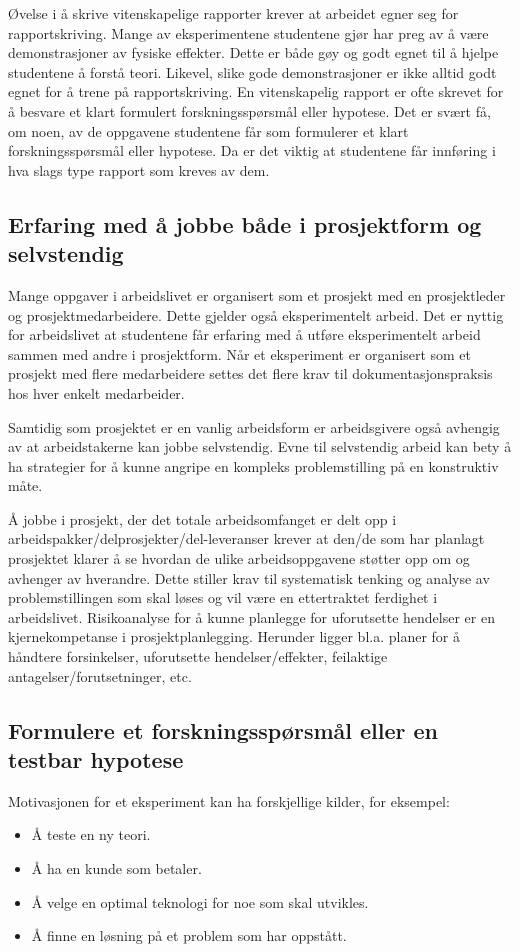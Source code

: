 \documentclass{article}
\begin{document}
Øvelse i å skrive vitenskapelige rapporter krever at arbeidet egner seg for rapportskriving. Mange av eksperimentene studentene gjør har preg av å være demonstrasjoner av fysiske effekter. Dette er både gøy og godt egnet til å hjelpe studentene å forstå teori. Likevel, slike gode demonstrasjoner er ikke alltid godt egnet for å trene på rapportskriving. En vitenskapelig rapport er ofte skrevet for å besvare et klart formulert forskningsspørsmål eller hypotese. Det er svært få, om noen, av de oppgavene studentene får som formulerer et klart forskningsspørsmål eller hypotese. Da er det viktig at studentene får innføring i hva slags type rapport som kreves av dem.




\subsection{Erfaring med å jobbe både i prosjektform og selvstendig}
Mange oppgaver i arbeidslivet er organisert som et prosjekt med en prosjektleder og prosjektmedarbeidere.
Dette gjelder også eksperimentelt arbeid.
Det er nyttig for arbeidslivet at studentene får erfaring med å utføre eksperimentelt arbeid sammen med andre i prosjektform.
Når et eksperiment er organisert som et prosjekt med flere medarbeidere settes det flere krav til dokumentasjonspraksis hos hver enkelt medarbeider.

Samtidig som prosjektet er en vanlig arbeidsform er arbeidsgivere også avhengig av at arbeidstakerne kan jobbe selvstendig.
Evne til selvstendig arbeid kan bety å ha strategier for å kunne angripe en kompleks problemstilling på en konstruktiv måte.

Å jobbe i prosjekt, der det totale arbeidsomfanget er delt opp i arbeidspakker/delprosjekter/del-leveranser krever at den/de som har planlagt prosjektet klarer å se hvordan de ulike arbeidsoppgavene støtter opp om og avhenger av hverandre.
Dette stiller krav til systematisk tenking og analyse av problemstillingen som skal løses og vil være en ettertraktet ferdighet i arbeidslivet.
Risikoanalyse for å kunne planlegge for uforutsette hendelser er en kjernekompetanse i prosjektplanlegging.
Herunder ligger bl.a. planer for å håndtere forsinkelser, uforutsette hendelser/effekter, feilaktige antagelser/forutsetninger, etc.

\subsection{Formulere et forskningsspørsmål eller en testbar hypotese}
Motivasjonen for et eksperiment kan ha forskjellige kilder, for eksempel:
\begin{itemize}
  \item Å teste en ny teori.
  \item Å ha en kunde som betaler.
  \item Å velge en optimal teknologi for noe som skal utvikles.
  \item Å finne en løsning på et problem som har oppstått.
\end{itemize}
\end{document}
